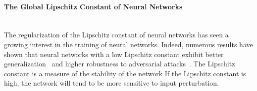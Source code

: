
\paragraph{The Global Lipschitz Constant of Neural Networks} ~\\

\noindent
The regularization of the Lipschitz constant of neural networks has seen a growing interest in the training of neural networks.
Indeed, numerous results have shown that neural networks with a low Lipschitz constant exhibit better generalization~\cite{bartlett2017spectrally} and higher robustness to adversarial attacks~\cite{szegedy2013intriguing,tsuzuku2018lipschitz, farnia2018generalizable}.
The Lipschitz constant is a measure of the stability of the network
If the Lipschitz constant is high, the network will tend to be more sensitive to input perturbation.



